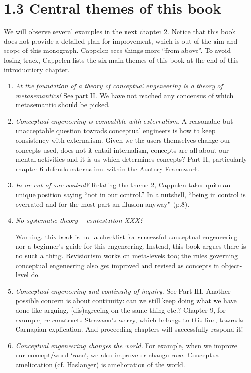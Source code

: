 \documentclass[
10pt, %
a4paper, %
twocolumn, %
landscape %
]{article}
\begin{document}
\section*{1.3 Central themes of this book}
We will observe several examples in the next chapter 2. Notice that this book does not provide a detailed plan for improvement, which is out of the aim and scope of this monograph. Cappelen sees things more ``from above''.
To avoid losing track, Cappelen lists the six main themes of this book at the end of this introductiory chapter.

\begin{enumerate}
  \item \emph{At the foundation of a theory of conceptual engeneering is a theory of metasemantics!}
See part II. We have not reached any concensus of which metasemantic should be picked.
  \item \emph{Conceptual engeneering is compatible with externalism.}
  A reasonable but unacceptable question towrads conceptual engineers is how to keep consistency with externalism. Given we the users themselves change our concepts used, does not it entail internalism, concepts are all about our mental activities and it is us which determines concepts?
Part II, particularly chapter 6 defends externalims within the Austery Framework.

  \item \emph{In or out of our control?}
  Relating the theme 2, Cappelen takes quite an unique position saying ``not in our control.''
In a nutshell, ``being in control is overrated and for the most part an illusion anyway'' (p.8).

  \item \emph{No systematic theory -- contestation XXX?}

  Warning: this book is not a checklist for successful conceptual engeneering nor a beginner's guide for this engeneering. Instead, this book argues there is no such a thing.
Revisionism works on meta-levels too; the rules governing conceptual engeneering also get improved and revised as concepts in object-level do.

  \item \emph{Conceptual engeneering and continuity of inquiry.}
  See Part III.
Another possible concern is about continuity: can we still keep doing what we have done like arguing, (dis)agreeing on the same thing etc.?
Chapter 9, for example, re-constructs Strawson's worry, which belongs to this line, towrads Carnapian explication. And proceeding chapters will successfully respond it!

  \item \emph{Conceptual engeneering changes the world.}
  For example, when we improve our concept/word `race', we also improve or change race.
Conceptual amelioration (cf. Haslanger) is amelioration of the world.

\end{enumerate}
\end{document}
